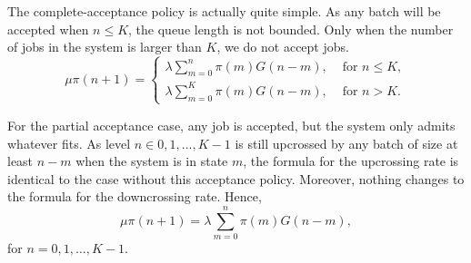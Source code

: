 \begin{exercise}
\begin{solution}
  The complete-acceptance policy is actually quite simple. As any
  batch will be accepted when $n\leq K$, the queue length is not
  bounded.  Only when the number of jobs in the system is larger than
  $K$, we do not accept jobs. 
  \begin{equation*}
    \mu \pi(n+1) = 
    \begin{cases}
      \lambda \sum_{m=0}^n \pi(m) G(n-m), & \text{ for } n\leq K,\\
      \lambda \sum_{m=0}^K \pi(m) G(n-m), & \text{ for } n> K.
    \end{cases}
  \end{equation*}





  For the partial acceptance case, any job is accepted, but the system
  only admits whatever fits.  As level $n\in {0,1,...,K-1}$ is still upcrossed by any batch of size at least $n-m$ when the system is in state $m$, the formula for the upcrossing rate is identical to the case without this acceptance policy. Moreover, nothing changes to the formula for the downcrossing rate. Hence, 
  \begin{equation*}
    \mu \pi(n+1) = \lambda \sum_{m=0}^n \pi(m) G(n-m), 
  \end{equation*}
  for $n=0,1,\ldots, K-1$. 
\end{solution}
\end{exercise}







